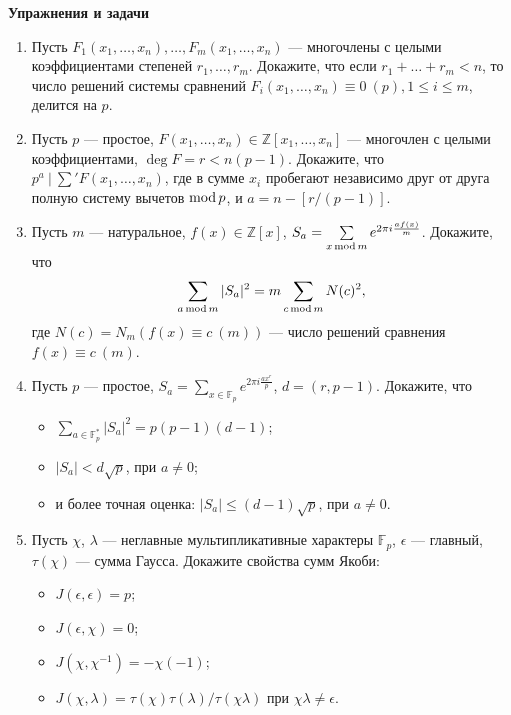\noindent\textbf{Упражнения и задачи}

\begin{enumerate}[topsep=0pt]
    
    \item Пусть $F_1(x_1,\dots, x_n), \dots, F_m(x_1,\dots, x_n)$ --- многочлены с целыми коэффициентами степеней $r_1, \dots, r_m$. Докажите, что если $r_1+\dots+r_m < n$, то число решений системы сравнений $F_i(x_1,\dots, x_n) \equiv 0\ (p), 1\leqslant i \leqslant m$, делится на $p$. %
    
    \item Пусть $p$ --- простое, $F(x_1, \dots, x_n)\in \mathbb{Z}[x_1,\dots,x_n]$ --- многочлен с целыми коэффициентами, $\deg F = r < n(p-1)$. Докажите, что $p^a\ |\ \sum' F(x_1, \dots, x_n)$, где в сумме $x_i$ пробегают независимо друг от друга полную систему вычетов $\operatorname{mod} p$, и $a=n-[r/(p-1)]$. %

    \item Пусть $m$ --- натуральное, $f(x) \in \mathbb{Z}[x]$, $S_a = \sum\limits_{x \operatorname{mod} m} e^{2\pi i \frac{af(x)}{m}}$. Докажите, что
    $$
        \sum\limits_{a \operatorname{mod} m} |S_a|^2 = m \sum\limits_{c \operatorname{mod} m} N(c)^2,
    $$
    где $N(c) = N_m\left(f(x) \equiv c\ (m)\right)$ --- число решений сравнения $f(x) \equiv c\ (m)$.

    \item Пусть $p$ --- простое, $S_a = \sum\limits_{x \in \mathbb{F}_p} e^{2\pi i \frac{a x^r}{p}}$, $d=(r,p-1)$. Докажите, что 
    \begin{itemize}[noitemsep,topsep=0pt]
        \item $\sum\limits_{a \in \mathbb{F}_p^*} |S_a|^2 = p(p-1)(d-1)$;
        \item $|S_a| < d \sqrt{p}$, при $a \neq 0$;
        \item и более точная оценка: $|S_a| \leqslant (d-1) \sqrt{p}$, при $a \neq 0$.
    \end{itemize} %

    \item Пусть $\chi$, $\lambda$ --- неглавные мультипликативные характеры $\mathbb{F}_p$, $\epsilon$ --- главный, $\tau(\chi)$ --- сумма Гаусса. Докажите свойства сумм Якоби:
        \begin{itemize}[topsep=0pt]
            \item $J(\epsilon,\epsilon)=p$;
            \item $J(\epsilon,\chi)=0$;
            \item $J(\chi,\chi^{-1})=-\chi(-1)$;
            \item $J(\chi,\lambda) = \tau(\chi)\tau(\lambda)/\tau(\chi\lambda)$ при $\chi\lambda \neq \epsilon$.
        \end{itemize} %


\end{enumerate}
